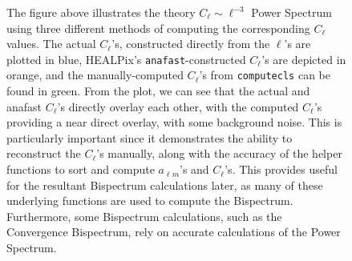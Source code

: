 \documentclass[11pt]{article}
\renewcommand{\_}[1]{\underline{ #1 }}
\newcommand{\us}{\textunderscore}
\begin{document}
{\begin{figure}[H]
    \centering
    \caption{The figure above illustrates the theory $C_{\ell} \sim \ell^{-3}$ Power Spectrum using three different methods of computing the corresponding $C_{\ell}$ values. The actual $C_{\ell}$'s, constructed directly from the $\ell$'s are plotted in blue, HEALPix's \texttt{anafast}-constructed $C_{\ell}$'s are depicted in orange, and the manually-computed $C_{\ell}$'s from \texttt{compute\us cls} can be found in green. From the plot, we can see that the actual and anafast $C_{\ell}$'s directly overlay each other, with the computed $C_{\ell}$'s providing a near direct overlay, with some background noise. This is particularly important since it demonstrates the ability to reconstruct the $C_{\ell}$'s manually, along with the accuracy of the helper functions to sort and compute $a_{\ell m}$'s and $C_{\ell}$'s. This provides useful for the resultant Bispectrum calculations later, as many of these underlying functions are used to compute the Bispectrum. Furthermore, some Bispectrum calculations, such as the Convergence Bispectrum, rely on accurate calculations of the Power Spectrum.}\label{fig:theory_l3_PS}
\end{figure}

}
\end{document}
